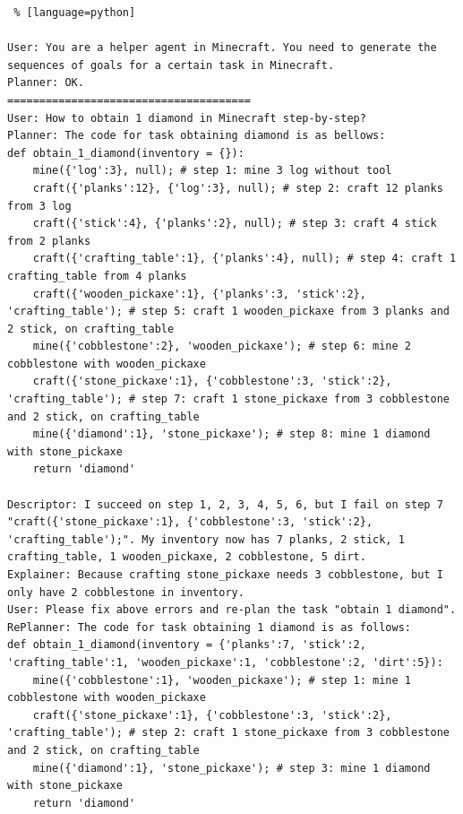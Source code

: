 \begin{lstlisting} % [language=python]  

User: You are a helper agent in Minecraft. You need to generate the sequences of goals for a certain task in Minecraft.
Planner: OK.
======================================
User: How to obtain 1 diamond in Minecraft step-by-step? 
Planner: The code for task obtaining diamond is as bellows:
def obtain_1_diamond(inventory = {}):
    mine({'log':3}, null); # step 1: mine 3 log without tool
    craft({'planks':12}, {'log':3}, null); # step 2: craft 12 planks from 3 log
    craft({'stick':4}, {'planks':2}, null); # step 3: craft 4 stick from 2 planks
    craft({'crafting_table':1}, {'planks':4}, null); # step 4: craft 1 crafting_table from 4 planks 
    craft({'wooden_pickaxe':1}, {'planks':3, 'stick':2}, 'crafting_table'); # step 5: craft 1 wooden_pickaxe from 3 planks and 2 stick, on crafting_table
    mine({'cobblestone':2}, 'wooden_pickaxe'); # step 6: mine 2 cobblestone with wooden_pickaxe
    craft({'stone_pickaxe':1}, {'cobblestone':3, 'stick':2}, 'crafting_table'); # step 7: craft 1 stone_pickaxe from 3 cobblestone and 2 stick, on crafting_table
    mine({'diamond':1}, 'stone_pickaxe'); # step 8: mine 1 diamond with stone_pickaxe
    return 'diamond'

Descriptor: I succeed on step 1, 2, 3, 4, 5, 6, but I fail on step 7 "craft({'stone_pickaxe':1}, {'cobblestone':3, 'stick':2}, 'crafting_table');". My inventory now has 7 planks, 2 stick, 1 crafting_table, 1 wooden_pickaxe, 2 cobblestone, 5 dirt.
Explainer: Because crafting stone_pickaxe needs 3 cobblestone, but I only have 2 cobblestone in inventory.
User: Please fix above errors and re-plan the task "obtain 1 diamond".
RePlanner: The code for task obtaining 1 diamond is as follows:
def obtain_1_diamond(inventory = {'planks':7, 'stick':2, 'crafting_table':1, 'wooden_pickaxe':1, 'cobblestone':2, 'dirt':5}):
    mine({'cobblestone':1}, 'wooden_pickaxe'); # step 1: mine 1 cobblestone with wooden_pickaxe
    craft({'stone_pickaxe':1}, {'cobblestone':3, 'stick':2}, 'crafting_table'); # step 2: craft 1 stone_pickaxe from 3 cobblestone and 2 stick, on crafting_table
    mine({'diamond':1}, 'stone_pickaxe'); # step 3: mine 1 diamond with stone_pickaxe
    return 'diamond'


\end{lstlisting}
